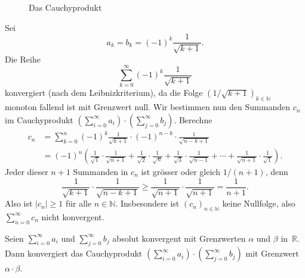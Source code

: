 \documentclass[../main.tex]{subfiles}
\begin{document}
\begin{figure}[htb] 
  \centering
  \begin{minipage}{0.50\textwidth}
    \centering

  \end{minipage}%
  \begin{minipage}{0.50\textwidth}
    \centering
    
  \end{minipage}%
  \caption{Das Cauchyprodukt}%
  \label{fig:cauchy}
\end{figure}

\begin{example}
  Sei 
  \[
    a_k = b_k = {(-1)}^k \frac{1}{\sqrt{k+1}}.
  \]
  Die Reihe
  \[
    \sum_{k=0}^{\infty} {(-1)}^k \frac{1}{\sqrt{k+1}}
  \]
  konvergiert (nach dem Leibnizkriterium),
  da die Folge ${(1/\sqrt{k+1})}_{k \in \mathbb{N}}$
  monoton fallend ist mit Grenzwert null.
  Wir bestimmen nun den Summanden $c_n$ im
  Cauchyprodukt
  $\left( \sum_{i=0}^{\infty} a_i \right) \cdot
  \left( \sum_{j=0}^{\infty} b_j \right)$.
  Berechne
  \begin{align*}
    c_n & = \sum_{k=0}^{n} {(-1)}^k \frac{1}{\sqrt{k+1}}
    \cdot {(-1)}^{n-k} \cdot \frac{1}{\sqrt{n-k+1}} \\
        &=
    (-1)^n \left(  
      \frac{1}{\sqrt 1} \cdot \frac{1}{\sqrt{n+1}}
      + \frac{1}{\sqrt 2} \cdot \frac{1}{\sqrt n}
      + \frac{1}{\sqrt 3} \cdot \frac{1}{\sqrt{n-1}}
      + \cdots
      + \frac{1}{\sqrt{n+1}} \cdot \frac{1}{\sqrt 1}
    \right).
  \end{align*}
Jeder dieser $n + 1$ Summanden in $c_n$ ist grösser oder
gleich $1/(n+1)$, denn
\[
  \frac{1}{\sqrt{k+1}}\cdot\frac{1}{\sqrt{n-k+1}}
  \geq \frac{1}{\sqrt{n+1}} \cdot \frac{1}{\sqrt{n+1}}
  = \frac{1}{n+1}.
\]
Also ist $|c_n| \geq 1$ für alle $n \in \mathbb{N}$.
Insbesondere ist ${(c_{n})}_{n \in \mathbb{N}}$ 
keine Nullfolge,
also $\sum_{n=0}^{\infty} c_n$ nicht konvergent.
\end{example}

\begin{theorem}\label{thm:cauchy-product}
  Seien
  $\sum_{i=0}^{\infty} a_i$ und $\sum_{j=0}^{\infty} b_j$ 
  absolut konvergent mit Grenzwerten $\alpha$ und $\beta$ 
  in~$\mathbb{R}$.
  Dann konvergiert das Cauchyprodukt
  $\left( \sum_{i=0}^{\infty} a_i \right) \cdot
  \left( \sum_{j=0}^{\infty} b_j \right)$ mit
  Grenzwert $\alpha \cdot \beta$.
\end{theorem}
\end{document}
